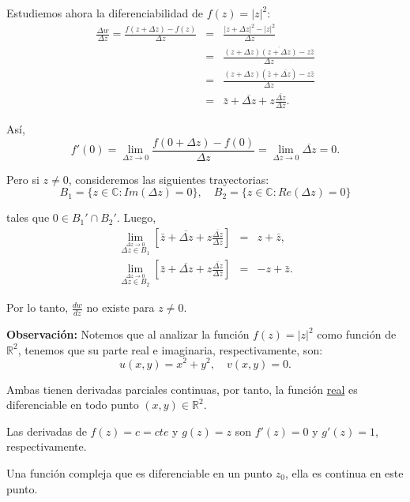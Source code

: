 \begin{ejemplo}
Estudiemos ahora la diferenciabilidad de $f(z) = |z|^2$:
\begin{eqnarray*}
\frac{\Delta w}{\Delta z} = \frac{f(z + \Delta z) - f(z)}{\Delta z} &=& \frac{|z + \Delta z|^2 - |z|^2}{\Delta z} \\
&=& \frac{(z+\Delta z)\overline{(z+\Delta z)} - z \bar{z}}{\Delta z} \\
&=& \frac{(z+\Delta z)(\bar{z}+\overline{\Delta z}) - z \bar{z}}{\Delta z} \\
&=& \bar{z} + \overline{\Delta z} + z \frac{\overline{\Delta z}}{\Delta z}.
\end{eqnarray*}

Así,
$$f'(0) = \lim_{\Delta z \to 0} \frac{f(0 + \Delta z) - f(0)}{\Delta z} = \lim_{\Delta z \to 0} \overline{\Delta z} =  0.$$

Pero si $z \neq 0$, consideremos las siguientes trayectorias:
$$B_1 = \{z \in \mathbb{C} : Im(\Delta z) = 0\}, \quad B_2 = \{z \in \mathbb{C} : Re(\Delta z) = 0\}$$

tales que $0 \in B_1' \cap B_2'$. Luego,
\begin{eqnarray*}
\lim_{\overset{\Delta z \to 0}{\Delta z \in B_1}} \left[ \bar{z} + \overline{\Delta z} + z \frac{\overline{\Delta z}}{\Delta z} \right] &=& z + \bar{z}, \\
\lim_{\overset{\Delta z \to 0}{\Delta z \in B_2}}\left[ \bar{z} + \overline{\Delta z} + z \frac{\overline{\Delta z}}{\Delta z}\right]&=& -z + \bar{z}. 
\end{eqnarray*}

Por lo tanto, $\frac{dw}{dz}$ no existe para $z \neq 0$.
\end{ejemplo}

\textbf{Observación:} Notemos que al analizar la función $f(z)  = |z|^2$ como función de $\mathbb{R}^2$, tenemos que su parte real e imaginaria, respectivamente, son:
$$u(x,y) = x^2 + y^2, \quad v(x,y) = 0.$$

Ambas tienen derivadas parciales continuas, por tanto, la función \underline{real} es diferenciable en todo punto $(x,y) \in \mathbb{R}^2$.

\begin{ejemplo}
Las derivadas de $f(z) = c = cte$ y $g(z) = z$ son $f'(z) = 0$ y $g'(z) = 1$, respectivamente.
\end{ejemplo}

\begin{propo}
Una función compleja que es diferenciable en un punto $z_0$, ella es continua en este punto.
\end{propo}

